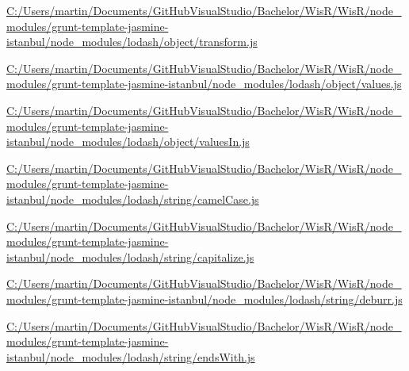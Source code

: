 \begin{DoxyCompactItemize}
\item 
\hyperlink{_c_1_2_users_2martin_2_documents_2_git_hub_visual_studio_2_bachelor_2_wis_r_2_wis_r_2node_module6d4a7bcdf10b974f4473d4135ecffd40}{C\+:/\+Users/martin/\+Documents/\+Git\+Hub\+Visual\+Studio/\+Bachelor/\+Wis\+R/\+Wis\+R/node\+\_\+modules/grunt-\/template-\/jasmine-\/istanbul/node\+\_\+modules/lodash/object/transform.\+js}
\item 
\hyperlink{_c_1_2_users_2martin_2_documents_2_git_hub_visual_studio_2_bachelor_2_wis_r_2_wis_r_2node_modulece2b201aab675ef2bbca0b83d000263e}{C\+:/\+Users/martin/\+Documents/\+Git\+Hub\+Visual\+Studio/\+Bachelor/\+Wis\+R/\+Wis\+R/node\+\_\+modules/grunt-\/template-\/jasmine-\/istanbul/node\+\_\+modules/lodash/object/values.\+js}
\item 
\hyperlink{_c_1_2_users_2martin_2_documents_2_git_hub_visual_studio_2_bachelor_2_wis_r_2_wis_r_2node_module13d3ad60a02a55538f47edbf79904433}{C\+:/\+Users/martin/\+Documents/\+Git\+Hub\+Visual\+Studio/\+Bachelor/\+Wis\+R/\+Wis\+R/node\+\_\+modules/grunt-\/template-\/jasmine-\/istanbul/node\+\_\+modules/lodash/object/values\+In.\+js}
\item 
\hyperlink{_c_1_2_users_2martin_2_documents_2_git_hub_visual_studio_2_bachelor_2_wis_r_2_wis_r_2node_modulea6de7e6e1b786047b26b88f4ded6ec54}{C\+:/\+Users/martin/\+Documents/\+Git\+Hub\+Visual\+Studio/\+Bachelor/\+Wis\+R/\+Wis\+R/node\+\_\+modules/grunt-\/template-\/jasmine-\/istanbul/node\+\_\+modules/lodash/string/camel\+Case.\+js}
\item 
\hyperlink{_c_1_2_users_2martin_2_documents_2_git_hub_visual_studio_2_bachelor_2_wis_r_2_wis_r_2node_modulec1895845049934dc5cc9c87570f3f021}{C\+:/\+Users/martin/\+Documents/\+Git\+Hub\+Visual\+Studio/\+Bachelor/\+Wis\+R/\+Wis\+R/node\+\_\+modules/grunt-\/template-\/jasmine-\/istanbul/node\+\_\+modules/lodash/string/capitalize.\+js}
\item 
\hyperlink{_c_1_2_users_2martin_2_documents_2_git_hub_visual_studio_2_bachelor_2_wis_r_2_wis_r_2node_module02d54d39578a75ca8775be0739d51acd}{C\+:/\+Users/martin/\+Documents/\+Git\+Hub\+Visual\+Studio/\+Bachelor/\+Wis\+R/\+Wis\+R/node\+\_\+modules/grunt-\/template-\/jasmine-\/istanbul/node\+\_\+modules/lodash/string/deburr.\+js}
\item 
\hyperlink{_c_1_2_users_2martin_2_documents_2_git_hub_visual_studio_2_bachelor_2_wis_r_2_wis_r_2node_moduleaad19f3147e59a1ddb303eb614a390f2}{C\+:/\+Users/martin/\+Documents/\+Git\+Hub\+Visual\+Studio/\+Bachelor/\+Wis\+R/\+Wis\+R/node\+\_\+modules/grunt-\/template-\/jasmine-\/istanbul/node\+\_\+modules/lodash/string/ends\+With.\+js}

\end{DoxyCompactItemize}
